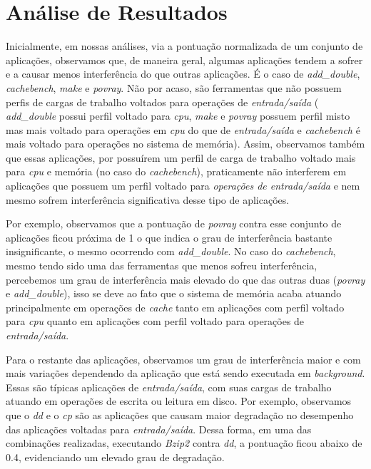 \section{Análise de Resultados}
\label{sec:resultados}

Inicialmente, em nossas análises, via a pontuação normalizada de um conjunto de
aplicações, observamos que, de maneira geral, algumas aplicações tendem a
sofrer e a causar menos interferência do que outras aplicações. É o caso de
\textit{add\_double}, \textit{cachebench}, \textit{make} e \textit{povray}. Não
por acaso, são ferramentas que não possuem perfis de cargas de trabalho
voltados para operações de \textit{entrada/saída} ( \textit{add\_double} possui
perfil voltado para \textit{cpu}, \textit{make} e \textit{povray} possuem
perfil misto mas mais voltado para operações em \textit{cpu} do que de
\textit{entrada/saída} e \textit{cachebench} é mais voltado para operações no
sistema de memória). Assim, observamos também que essas aplicações, por
possuírem um perfil de carga de trabalho voltado mais para \textit{cpu} e
memória (no caso do \textit{cachebench}), praticamente não interferem em
aplicações que possuem um perfil voltado para \textit{operações de
entrada/saída} e nem mesmo sofrem interferência significativa desse tipo de
aplicações.

Por exemplo, observamos que a pontuação de \textit{povray} contra esse conjunto
de aplicações ficou próxima de 1 o que indica o grau de interferência bastante
insignificante, o mesmo ocorrendo com \textit{add\_double}. No caso do
\textit{cachebench}, mesmo tendo sido uma das ferramentas que menos sofreu
interferência, percebemos um grau de interferência mais elevado do que das
outras duas (\textit{povray} e \textit{add\_double}), isso se deve ao fato que
o sistema de memória acaba atuando principalmente em operações de
\textit{cache} tanto em aplicações com perfil voltado para \textit{cpu} quanto
em aplicações com perfil voltado para operações de \textit{entrada/saída}.

Para o restante das aplicações, observamos um grau de interferência maior e com
mais variações dependendo da aplicação que está sendo executada em
\textit{background}. Essas são típicas aplicações de \textit{entrada/saída},
com suas cargas de trabalho atuando em operações de escrita ou leitura em
disco. Por exemplo, observamos que o \textit{dd} e o \textit{cp} são as
aplicações que causam maior degradação no desempenho das aplicações voltadas
para \textit{entrada/saída}. Dessa forma, em uma das combinações realizadas,
executando \textit{Bzip2} contra \textit{dd}, a pontuação ficou abaixo de 0.4,
evidenciando um elevado grau de degradação.


